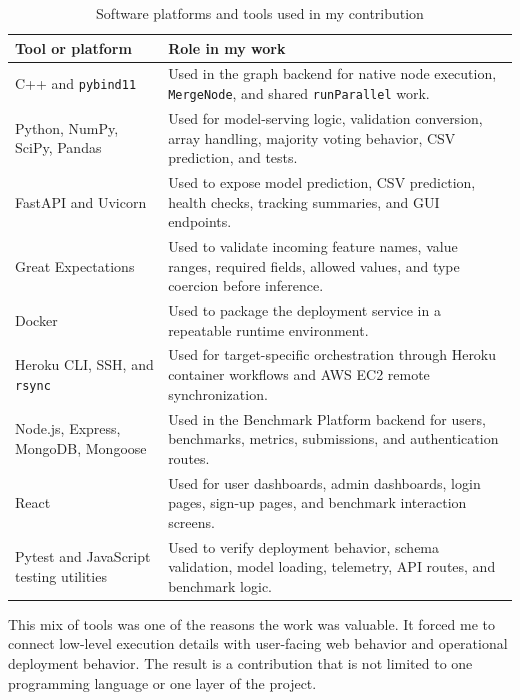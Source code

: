 \documentclass[12pt,a4paper,oneside]{report}
\newcommand{\modulepath}[1]{\texttt{#1}}
\begin{document}
\begin{table}[H]
\centering
\small
\caption{Software platforms and tools used in my contribution}
\label{tab:individual-platforms}
\begin{tabularx}{\textwidth}{p{}X}
\toprule
\textbf{Tool or platform} & \textbf{Role in my work} \\
\midrule
C++ and \modulepath{pybind11} &
Used in the graph backend for native node execution, \modulepath{MergeNode}, and shared \modulepath{runParallel} work. \\
\midrule
Python, NumPy, SciPy, Pandas &
Used for model-serving logic, validation conversion, array handling, majority voting behavior, CSV prediction, and tests. \\
\midrule
FastAPI and Uvicorn &
Used to expose model prediction, CSV prediction, health checks, tracking summaries, and GUI endpoints. \\
\midrule
Great Expectations &
Used to validate incoming feature names, value ranges, required fields, allowed values, and type coercion before inference. \\
\midrule
Docker &
Used to package the deployment service in a repeatable runtime environment. \\
\midrule
Heroku CLI, SSH, and \modulepath{rsync} &
Used for target-specific orchestration through Heroku container workflows and AWS EC2 remote synchronization. \\
\midrule
Node.js, Express, MongoDB, Mongoose &
Used in the Benchmark Platform backend for users, benchmarks, metrics, submissions, and authentication routes. \\
\midrule
React &
Used for user dashboards, admin dashboards, login pages, sign-up pages, and benchmark interaction screens. \\
\midrule
Pytest and JavaScript testing utilities &
Used to verify deployment behavior, schema validation, model loading, telemetry, API routes, and benchmark logic. \\
\bottomrule
\end{tabularx}
\end{table}

This mix of tools was one of the reasons the work was valuable. It forced me to connect low-level execution details with user-facing web behavior and operational deployment behavior. The result is a contribution that is not limited to one programming language or one layer of the project.

\end{document}
